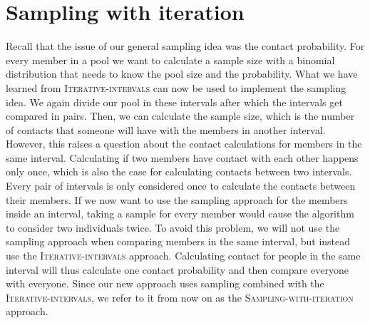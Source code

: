\section{Sampling with iteration}
\label{sec:sampling_with_iteration}
Recall that the issue of our general sampling idea was the contact probability. For every member in a pool we want to calculate a sample size with a binomial distribution that needs to know the pool size and the probability. What we have learned from \textsc{Iterative-intervals} can now be used to implement the sampling idea. We again divide our pool in these intervals after which the intervals get compared in pairs. Then, we can calculate the sample size, which is the number of contacts that someone will have with the members in another interval. However, this raises a question about the contact calculations for members in the same interval. Calculating if two members have contact with each other happens only once, which is also the case for calculating contacts between two intervals. Every pair of intervals is only considered once to calculate the contacts between their members. If we now want to use the sampling approach for the members inside an interval, taking a sample for every member would cause the algorithm to consider two individuals twice. To avoid this problem, we will not use the sampling approach when comparing members in the same interval, but instead use the \textsc{Iterative-intervals} approach. Calculating contact for people in the same interval will thus calculate one contact probability and then compare everyone with everyone. Since our new approach uses sampling combined with the \textsc{Iterative-intervals}, we refer to it from now on as the \textsc{Sampling-with-iteration} approach.

